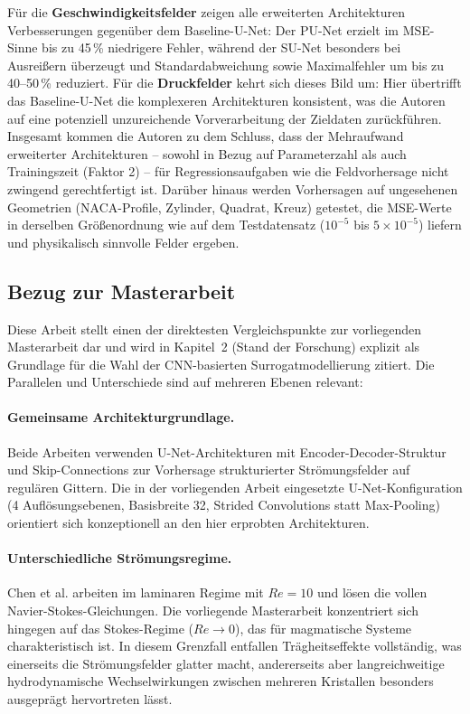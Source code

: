 \documentclass[a4paper,12pt]{article}
\begin{document}
Für die \textbf{Geschwindigkeitsfelder} zeigen alle erweiterten Architekturen Verbesserungen gegenüber dem Baseline-U-Net: Der PU-Net erzielt im MSE-Sinne bis zu 45\,\% niedrigere Fehler, während der SU-Net besonders bei Ausreißern überzeugt und Standardabweichung sowie Maximalfehler um bis zu 40--50\,\% reduziert. Für die \textbf{Druckfelder} kehrt sich dieses Bild um: Hier übertrifft das Baseline-U-Net die komplexeren Architekturen konsistent, was die Autoren auf eine potenziell unzureichende Vorverarbeitung der Zieldaten zurückführen. Insgesamt kommen die Autoren zu dem Schluss, dass der Mehraufwand erweiterter Architekturen -- sowohl in Bezug auf Parameterzahl als auch Trainingszeit (Faktor 2) -- für Regressionsaufgaben wie die Feldvorhersage nicht zwingend gerechtfertigt ist. Darüber hinaus werden Vorhersagen auf ungesehenen Geometrien (NACA-Profile, Zylinder, Quadrat, Kreuz) getestet, die MSE-Werte in derselben Größenordnung wie auf dem Testdatensatz ($10^{-5}$ bis $5 \times 10^{-5}$) liefern und physikalisch sinnvolle Felder ergeben.

\subsection*{Bezug zur Masterarbeit}

Diese Arbeit stellt einen der direktesten Vergleichspunkte zur vorliegenden Masterarbeit dar und wird in Kapitel~2 (Stand der Forschung) explizit als Grundlage für die Wahl der CNN-basierten Surrogatmodellierung zitiert. Die Parallelen und Unterschiede sind auf mehreren Ebenen relevant:

\paragraph{Gemeinsame Architekturgrundlage.} Beide Arbeiten verwenden U-Net-Architekturen mit Encoder-Decoder-Struktur und Skip-Connections zur Vorhersage strukturierter Strömungsfelder auf regulären Gittern. Die in der vorliegenden Arbeit eingesetzte U-Net-Konfiguration (4 Auflösungsebenen, Basisbreite 32, Strided Convolutions statt Max-Pooling) orientiert sich konzeptionell an den hier erprobten Architekturen.

\paragraph{Unterschiedliche Strömungsregime.} Chen et al. arbeiten im laminaren Regime mit $Re = 10$ und lösen die vollen Navier-Stokes-Gleichungen. Die vorliegende Masterarbeit konzentriert sich hingegen auf das Stokes-Regime ($Re \to 0$), das für magmatische Systeme charakteristisch ist. In diesem Grenzfall entfallen Trägheitseffekte vollständig, was einerseits die Strömungsfelder glatter macht, andererseits aber langreichweitige hydrodynamische Wechselwirkungen zwischen mehreren Kristallen besonders ausgeprägt hervortreten lässt.
\end{document}
